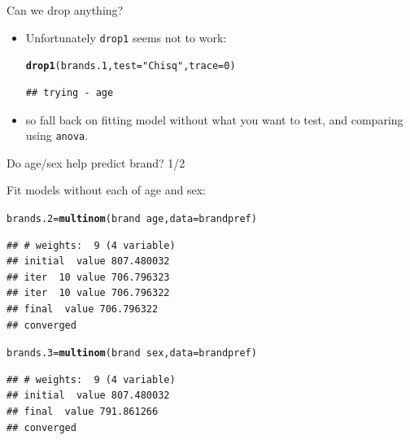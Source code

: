 \documentclass[unknownkeysallowed]{beamer}\usepackage[]{graphicx}\usepackage[]{color}
\makeatletter
\newcommand{\hlnum}[1]{\textcolor[rgb]{0.686,0.059,0.569}{#1}}%
\newcommand{\hlstr}[1]{\textcolor[rgb]{0.192,0.494,0.8}{#1}}%
\newcommand{\hlopt}[1]{\textcolor[rgb]{0,0,0}{#1}}%
\newcommand{\hlstd}[1]{\textcolor[rgb]{0.345,0.345,0.345}{#1}}%
\newcommand{\hlkwb}[1]{\textcolor[rgb]{0.69,0.353,0.396}{#1}}%
\newcommand{\hlkwc}[1]{\textcolor[rgb]{0.333,0.667,0.333}{#1}}%
\newcommand{\hlkwd}[1]{\textcolor[rgb]{0.737,0.353,0.396}{\textbf{#1}}}%
\newenvironment{kframe}{%
 \def\at@end@of@kframe{}%
 \ifinner\ifhmode%
  \def\at@end@of@kframe{\end{minipage}}%
  \begin{minipage}{\columnwidth}%
 \fi\fi%
 \def\FrameCommand##1{\hskip\@totalleftmargin \hskip-\fboxsep
 \colorbox{shadecolor}{##1}\hskip-\fboxsep
     \hskip-\linewidth \hskip-\@totalleftmargin \hskip\columnwidth}%
 \MakeFramed {\advance\hsize-\width
   \@totalleftmargin\z@ \linewidth\hsize
   \@setminipage}}%
 {\par\unskip\endMakeFramed%
 \at@end@of@kframe}
\newenvironment{knitrout}{}{} %
\makeatother
\begin{document}
\begin{frame}[fragile]{Can we drop anything?}
  
  
  \begin{itemize}
  \item Unfortunately \texttt{drop1} seems not to work:
\begin{knitrout}
\color{fgcolor}\begin{kframe}
\begin{alltt}
\hlkwd{drop1}\hlstd{(brands.1,}\hlkwc{test}\hlstd{=}\hlstr{"Chisq"}\hlstd{,}\hlkwc{trace}\hlstd{=}\hlnum{0}\hlstd{)}
\end{alltt}
\begin{verbatim}
## trying - age
\end{verbatim}


{\ttfamily\noindent\bfseries{}}\end{kframe}
\end{knitrout}
\item so fall back on fitting model without what you want to test, and
  comparing using \texttt{anova}.    
  \end{itemize}
  
\end{frame}

\begin{frame}[fragile]{Do age/sex help predict brand? 1/2}

Fit models without each of age and sex:

 
\begin{knitrout}
\color{fgcolor}\begin{kframe}
\begin{alltt}
\hlstd{brands.2}\hlkwb{=}\hlkwd{multinom}\hlstd{(brand}\hlopt{~}\hlstd{age,}\hlkwc{data}\hlstd{=brandpref)}
\end{alltt}
\begin{verbatim}
## # weights:  9 (4 variable)
## initial  value 807.480032 
## iter  10 value 706.796323
## iter  10 value 706.796322
## final  value 706.796322 
## converged
\end{verbatim}
\begin{alltt}
\hlstd{brands.3}\hlkwb{=}\hlkwd{multinom}\hlstd{(brand}\hlopt{~}\hlstd{sex,}\hlkwc{data}\hlstd{=brandpref)}
\end{alltt}
\begin{verbatim}
## # weights:  9 (4 variable)
## initial  value 807.480032 
## final  value 791.861266 
## converged
\end{verbatim}
\end{kframe}
\end{knitrout}


  
\end{frame}
\end{document}
